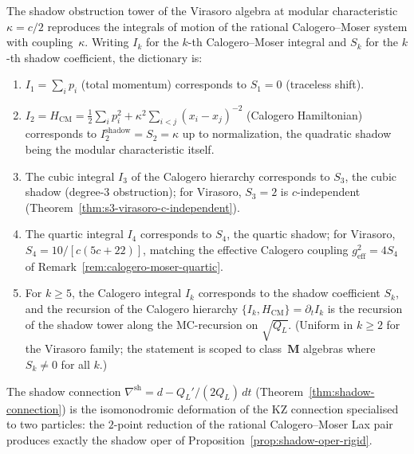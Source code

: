 \begin{proposition}%
\label{prop:calogero-shadow-dictionary}%
\ClaimStatusConditional%
%
%
The shadow obstruction tower of the Virasoro algebra at
modular characteristic~$\kappa = c/2$ reproduces the
integrals of motion of the rational Calogero--Moser system
with coupling~$\kappa$. Writing $I_k$ for the $k$-th
Calogero--Moser integral and $S_k$ for the $k$-th shadow
coefficient, the dictionary is:
\begin{enumerate}[label=\textup{(\roman*)}]
\item
$I_1 = \sum_i p_i$ \textup{(}total momentum\textup{)}
corresponds to $S_1 = 0$ \textup{(}traceless shift\textup{)}.
\item
$I_2 = H_{\mathrm{CM}}
= \tfrac{1}{2}\sum_i p_i^2
+ \kappa^2 \sum_{i<j} (x_i{-}x_j)^{-2}$
\textup{(}Calogero Hamiltonian\textup{)}
corresponds to $I_2^{\mathrm{shadow}} = S_2 = \kappa$
up to normalization, the quadratic shadow being the
modular characteristic itself.
\item
The cubic integral $I_3$ of the Calogero hierarchy
corresponds to $S_3$, the cubic shadow \textup{(}degree-$3$
obstruction\textup{)}; for Virasoro, $S_3 = 2$ is
$c$-independent \textup{(}Theorem~\textup{\ref{thm:s3-virasoro-c-independent}}\textup{)}.
\item
The quartic integral $I_4$ corresponds to $S_4$, the quartic
shadow; for Virasoro, $S_4 = 10/[c(5c{+}22)]$, matching
the effective Calogero coupling $g^2_{\mathrm{eff}} = 4S_4$
of Remark~\textup{\ref{rem:calogero-moser-quartic}}.
\item
For $k \geq 5$, the Calogero integral $I_k$ corresponds to
the shadow coefficient $S_k$, and the recursion of the
Calogero hierarchy
$\{I_k, H_{\mathrm{CM}}\} = \partial_t I_k$
is the recursion of the shadow tower along the MC-recursion
on $\sqrt{Q_L}$. \textup{(}Uniform in $k \geq 2$ for the
Virasoro family; the statement is scoped to class~$\mathbf{M}$
algebras where $S_k \neq 0$ for all $k$.\textup{)}
\end{enumerate}
The shadow connection
$\nabla^{\mathrm{sh}} = d - Q_L'/(2Q_L)\,dt$
\textup{(}Theorem~\textup{\ref{thm:shadow-connection}}\textup{)}
is the isomonodromic deformation of the KZ connection
specialised to two particles: the $2$-point reduction of the
rational Calogero--Moser Lax pair produces exactly the
shadow oper of Proposition~\textup{\ref{prop:shadow-oper-rigid}}.
\end{proposition}

